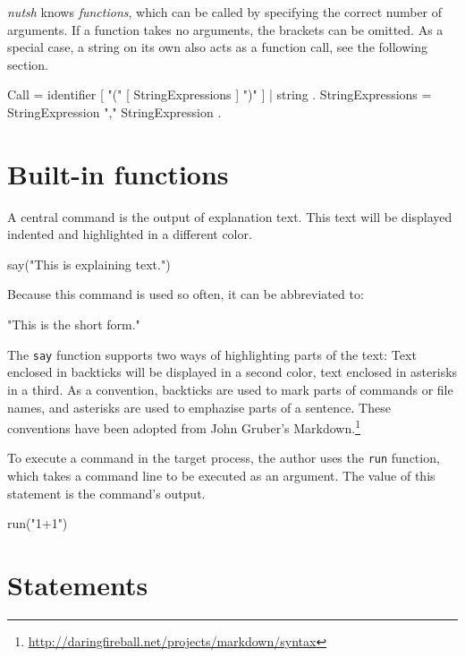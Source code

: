\documentclass[paper=a4,twoside,abstract=on,cleardoublepage=empty,numbers=noenddot,toc=bib,11pt,appendixprefix=true]{scrreprt}
\begin{document}

\emph{nutsh} knows \emph{functions}, which can be called by specifying the correct number of arguments. If a function takes no arguments, the brackets can be omitted. As a special case, a string on its own also acts as a function call, see the following section.

\begin{ebnf}
Call = identifier [ "(" [ StringExpressions ] ")" ] |
        string .
StringExpressions = StringExpression { "," StringExpression } .
\end{ebnf}

\section{Built-in functions}

A central command is the output of explanation text. This text will be displayed indented and highlighted in a different color.

\begin{nutsh}
say("This is explaining text.")
\end{nutsh}
%
Because this command is used so often, it can be abbreviated to:

\begin{nutsh}
"This is the short form."
\end{nutsh}
%
The \texttt{say} function supports two ways of highlighting parts of the text: Text enclosed in backticks will be displayed in a second color, text enclosed in asterisks in a third. As a convention, backticks are used to mark parts of commands or file names, and asterisks are used to emphazise parts of a sentence. These conventions have been adopted from John Gruber's Markdown.\footnote{\url{http://daringfireball.net/projects/markdown/syntax}}

To execute a command in the target process, the author uses the \texttt{run} function, which takes a command line to be executed as an argument. The value of this statement is the command's output.

\begin{nutsh}
run("1+1")
\end{nutsh}

\section{Statements}
\label{sec:statements}

\end{document}
